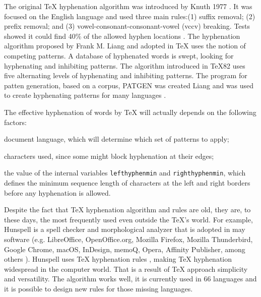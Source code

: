 \documentclass{article}
\begin{document}
The original \TeX{} hyphenation algorithm was introduced by Knuth 1977
\cite{knuth1977}. It was focused on the English language and used three main
rules:(1) suffix removal; (2) prefix removal; and (3)
vowel-consonant-consonant-vowel (vccv) breaking. Tests showed it could find
40\% of the allowed hyphen locations \cite{liang1983}. The hyphenation
algorithm proposed by Frank M. Liang and adopted in \TeX{} uses the notion of
competing patterns. A database of hyphenated words is swept, looking for
hyphenating and inhibiting patterns. The algorithm introduced in \TeX{}82 uses
five alternating levels of hyphenating and inhibiting patterns. The program
for patten generation, based on a corpus, PATGEN was created Liang
\cite{liangbreitenlohner1999} and was used to create hyphenating patterns for
many languages
\cite{sojka1995,sojka1995a,sojka2005thesis,sojka2003,scannell2003}.

The effective hyphenation of words by \TeX{} will actually depends on the following factors:
\begin{enumerate*}[label=\arabic*)]
    \item document language, which will determine which set of patterns to apply;
    \item characters used, since some might block hyphenation at their edges;
    \item the value of the internal variables \verb|lefthyphenmin| and \verb|righthyphenmin|,
        which defines the minimum sequence length of characters at the left and right borders
        before any hyphenation is allowed.
\end{enumerate*}

Despite the fact that \TeX{} hyphenation algorithm and rules are old, they are,
to these days, the most frequently used even outside the \TeX{}'s world. For
example, Hunspell is a spell checker and morphological analyzer that is adopted
in may software (e.g. LibreOffice, OpenOffice.org, Mozilla Firefox, Mozilla
Thunderbird, Google Chrome, macOS, InDesign, memoQ, Opera, Affinity Publisher,
among others \cite{hunspell}). Hunspell uses \TeX{} hyphenation rules
\cite{hunspellhyphen}, making \TeX{} hyphenation widespread in the computer
world. That is a result of \TeX{} approach simplicity and versatility. The
algorithm works well, it is currently used in 66 languages
\cite{texhyphenrules} and it is possible to design new rules for those missing
languages.


\end{document}
